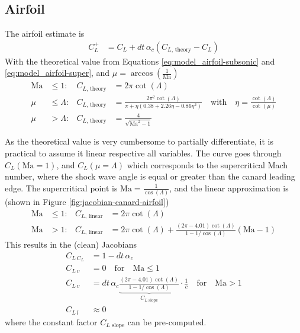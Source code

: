 \subsection{Airfoil}
\label{sec:jacobians-airfoil}
The airfoil estimate  is
\begin{align}
    C_L^+ &= C_L + dt \, \alpha_c (C_{L\text{, theory}} - C_L) \label{eq:jacobian-cl-update}
\end{align}
With the theoretical value from Equations \ref{eq:model_airfoil-subsonic} and \ref{eq:model_airfoil-super}, and $\mu = \arccos(\frac{1}{\mathrm{Ma}})$
\begin{align}
    \mathrm{Ma} &\leq  1: & C_{L\text{, theory}} &= 2 \pi\cot(\Lambda)
    \\
    \mu &\leq \Lambda : & C_{L\text{, theory}} &= \frac{2 \pi^2 \cot(\Lambda)}{\pi + \eta (0.38 + 2.26 \eta - 0.86 \eta^2)} \quad \text{with} \quad \eta = \frac{\cot(\Lambda)}{\cot(\mu)} 
    \\
    \mu &> \Lambda : &C_{L\text{, theory}} &= \frac{4}{\sqrt{\mathrm{Ma}^2-1}}
\end{align}

As the theoretical value is very cumbersome to partially differentiate, it is practical to assume it linear respective all variables. 
The curve goes through $C_L(\mathrm{Ma}=1)$, and $C_L(\mu = \Lambda)$ which corresponds to the supercritical Mach number, where the shock wave angle is equal or greater than the canard leading edge.
The supercritical point is $\mathrm{Ma} = \frac{1}{\cos(\Lambda)}$, and the linear approximation is (shown in Figure \ref{fig:jacobian-canard-airfoil})
\begin{align}
    \mathrm{Ma} &\leq  1: & C_{L\text{, linear}} &= 2 \pi\cot(\Lambda)
    \\
    \mathrm{Ma} &>  1: & C_{L\text{, linear}} &= 2 \pi\cot(\Lambda) + \frac{(2 \pi - 4.01) \cot(\Lambda)}{1 - 1/\cos(\Lambda)} (\mathrm{Ma}-1)
\end{align}
This results in the (clean) Jacobians
\begin{align}
    C_{L \, C_L} &= 1 - dt \, \alpha_c
    \\
    C_{L \, v} &= 0 \quad\text{for}\quad \mathrm{Ma}\leq 1
    \\
    C_{L \, v} &=  dt \, \alpha_c  
    \underbrace{\frac{(2 \pi - 4.01) \cot(\Lambda)}{1 - 1/\cos(\Lambda)}}_{C_{L \text{ slope}}} \cdot \frac{1}{c}
    \quad\text{for}\quad \mathrm{Ma}> 1
    \\
    C_{L \, l} &\approx 0
\end{align}
where the constant factor $C_{L \text{ slope}}$ can be pre-computed.

